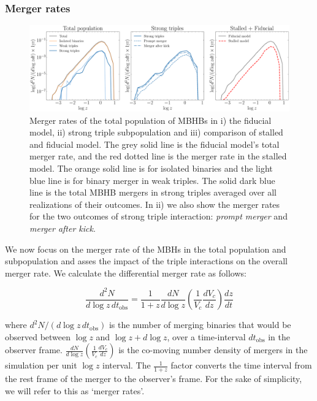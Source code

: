 \documentclass[11pt, letterpaper]{article}
\begin{document}
\subsubsection{Merger rates}
\label{sec:merger-rates}

\begin{figure}[!htb] 
    \centering
    \includegraphics[scale=0.45]{fig/Merger_rate_w_stalled_N_100.pdf}
    \caption{Merger rates of the total population of MBHBs in i) the fiducial model, ii) strong triple subpopulation and iii) comparison of stalled and fiducial model. The grey solid line is the fiducial model's total merger rate, and the red dotted line is the merger rate in the stalled model. The orange solid line is for isolated binaries and the light blue line is for binary merger in weak triples. The solid dark blue line is the total MBHB mergers in strong triples averaged over all realizations of their outcomes. In ii) we also show the merger rates for the two outcomes of strong triple interaction: \emph{prompt merger} and \emph{merger after kick}.}     
    \label{fig:merger-rates}
\end{figure}


We now focus on the merger rate of the MBHs in the total population and subpopulation and asses the impact of the triple interactions on the overall merger rate. We calculate the differential merger rate as follows: 

\begin{equation}
\frac{d^2N}{d \log{z} \, dt_{\text{obs}}} = \frac{1}{1+z} \frac{dN}{d \log{z}} \left( \frac{1}{V_c}\frac{d V_c}{dz}\right) \frac{d z}{dt}    
\label{eq: merger rate}
\end{equation}

where $d^2N/(d \log{z} \, dt_{\text{obs}})$ is the number of merging binaries that would be observed between $\log{z}$ and $\log{z} + d \log{z}$, over a time-interval $dt_{\text{obs}}$ in the observer frame. $\frac{dN}{d \log{z}} \left( \frac{1}{V_c}\frac{d V_c}{dz}\right)$ is the co-moving number density of mergers in the simulation per unit $\log{z}$ interval. The $\frac{1}{1+z}$ factor converts the time interval from the rest frame of the merger to the observer's frame. For the sake of simplicity, we will refer to this as `merger rates'.
\end{document}
